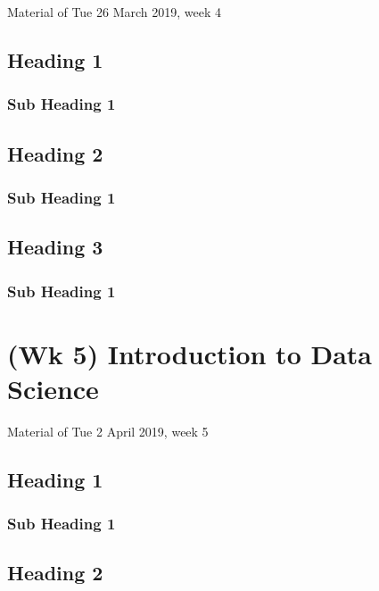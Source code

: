 \documentclass[]{book}
\begin{document}
Material of Tue 26 March 2019, week 4

\section{Heading 1}\label{heading-1-2}

\subsection{Sub Heading 1}\label{sub-heading-1-6}

\section{Heading 2}\label{heading-2-2}

\subsection{Sub Heading 1}\label{sub-heading-1-7}

\section{Heading 3}\label{heading-3-2}

\subsection{Sub Heading 1}\label{sub-heading-1-8}

\chapter{(Wk 5) Introduction to Data
Science}\label{wk-5-introduction-to-data-science}

Material of Tue 2 April 2019, week 5

\section{Heading 1}\label{heading-1-3}

\subsection{Sub Heading 1}\label{sub-heading-1-9}

\section{Heading 2}\label{heading-2-3}
\end{document}
